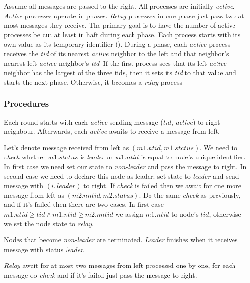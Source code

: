 \documentclass{article}
\begin{document}
Assume all messages are passed to the right. All processes are initially \textit{active}. \textit{Active} processes operate in phases. \textit{Relay} processes in one phase just pass two at most messages they receive. The primary goal is to have the number of active processes be cut at least in haft during each phase. Each process starts with its own value as its temporary identifier (). During a phase, each \textit{active} process receives the \textit{tid} of its nearest \textit{active} neighbor to the left and that neighbor's nearest left \textit{active} neighbor's \textit{tid}. If the first process sees that its left \textit{active} neighbor has the largest of the three tids, then it sets its \textit{tid} to that value and starts the next phase. Otherwise, it becomes a \textit{relay} process.

\subsubsection*{Procedures}

Each round starts with each \textit{active} sending message ($tid$, \textit{active}) to right neighbour. Afterwards, each \textit{active} awaits to receive a message from left.

Let's denote message received from left as $(m1.ntid, m1.status)$. We need to \textit{check} whether $m1.status$ is \textit{leader} or $m1.ntid$ is equal to node's unique identifier. In first case we need set our state to \textit{non-leader} and pass the message to right. In second case we need to declare this node as leader: set state to \textit{leader} and send message with $(i, \textit{leader})$ to right. If \textit{check} is failed then we await for one more message from left as $(m2.nntid, m2.status)$. Do the same \textit{check} as previously, and if it's failed then there are two cases. In first case $m1.ntid \geq tid \land m1.ntid \geq m2.nntid$ we assign $m1.ntid$ to node's $tid$, otherwise we set the node state to \textit{relay}.

Nodes that become \textit{non-leader} are terminated. \textit{Leader} finishes when it receives message with status \textit{leader}.

\textit{Relay} await for at most two messages from left processed one by one, for each message do \textit{check} and if it's failed just pass the message to right.
\end{document}
